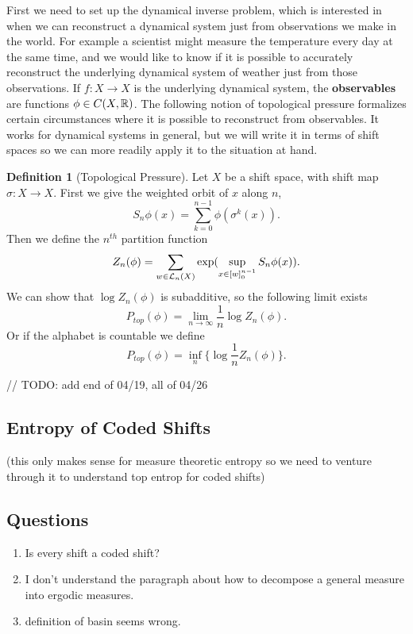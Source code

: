 \documentclass[11pt, reqno]{amsart}
\theoremstyle{plain}
\theoremstyle{definition}
\newtheorem{defn}[thm]{Definition}
\begin{document}
First we need to set up the dynamical inverse problem, which is interested in when we can reconstruct a dynamical system just from observations we make in the world. For example a scientist might measure the temperature every day at the same time, and we would like to know if it is possible to accurately reconstruct the underlying dynamical system of weather just from those observations. If $f: X \rightarrow X$ is the underlying dynamical system, the \textbf{observables} are functions $\phi \in C(X,\mathbb{R})$. The following notion of topological pressure formalizes certain circumstances where it is possible to reconstruct from observables. It works for dynamical systems in general, but we will write it in terms of shift spaces so we can more readily apply it to the situation at hand.
\begin{defn}[Topological Pressure]
  Let $X$ be a shift space, with shift map $\sigma: X \rightarrow X$. First we give the weighted orbit of $x$ along $n$,
  $$S_n\phi(x) = \sum_{k=0}^{n-1}\phi(\sigma^k(x)).$$
  Then we define the $n^{th}$ partition function
  $$Z_n(\phi) = \sum_{w \in \mathcal{L}_n(X)}\exp(\sup_{x \in [w]_0^{n-1}} S_n\phi(x)).$$ 
  We can show that $\log Z_n(\phi)$ is subadditive, so the following limit exists 
  $$P_{top}(\phi) = \lim_{n\rightarrow \infty}\frac{1}{n}\log Z_n(\phi).$$
  Or if the alphabet is countable we define 
  $$P_{top}(\phi) = \inf_n \{\log \frac{1}{n}Z_n(\phi)\}.$$
\end{defn}

// TODO: add end of 04/19, all of 04/26

\subsection{Entropy of Coded Shifts}\cite[L12]{wolf}
(this only makes sense for measure theoretic entropy so we need to venture through it to understand top entrop for coded shifts)

\subsection{Questions}
\begin{enumerate}
  \item Is every shift a coded shift?
  \item I don't understand the paragraph about how to decompose a general measure into ergodic measures.
  \item definition of basin seems wrong.
\end{enumerate}
\end{document}
